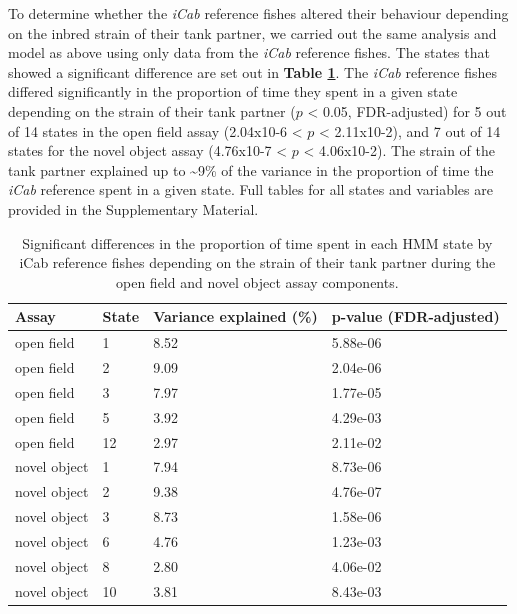 \documentclass[
]{book}
\begin{document}
To determine whether the \emph{iCab} reference fishes altered their behaviour depending on the inbred strain of their tank partner, we carried out the same analysis and model as above using only data from the \emph{iCab} reference fishes. The states that showed a significant difference are set out in \textbf{Table \ref{tab:pilot-sge-tbl}}. The \emph{iCab} reference fishes differed significantly in the proportion of time they spent in a given state depending on the strain of their tank partner (\(p\) \textless{} 0.05, FDR-adjusted) for 5 out of 14 states in the open field assay (2.04x10-6 \textless{} \(p\) \textless{} 2.11x10-2), and 7 out of 14 states for the novel object assay (4.76x10-7 \textless{} \(p\) \textless{} 4.06x10-2). The strain of the tank partner explained up to \textasciitilde9\% of the variance in the proportion of time the \emph{iCab} reference spent in a given state. Full tables for all states and variables are provided in the Supplementary Material.

\begin{table}

\caption{\label{tab:pilot-sge-tbl}Significant differences in the proportion of time spent in each HMM state by iCab reference fishes depending on the strain of their tank partner during the open field and novel object assay components.}
\centering
\begin{tabular}[t]{l|l|l|l}
\hline
Assay & State & Variance explained (\%) & p-value (FDR-adjusted)\\
\hline
open field & 1 & 8.52 & 5.88e-06\\
\hline
open field & 2 & 9.09 & 2.04e-06\\
\hline
open field & 3 & 7.97 & 1.77e-05\\
\hline
open field & 5 & 3.92 & 4.29e-03\\
\hline
open field & 12 & 2.97 & 2.11e-02\\
\hline
novel object & 1 & 7.94 & 8.73e-06\\
\hline
novel object & 2 & 9.38 & 4.76e-07\\
\hline
novel object & 3 & 8.73 & 1.58e-06\\
\hline
novel object & 6 & 4.76 & 1.23e-03\\
\hline
novel object & 8 & 2.80 & 4.06e-02\\
\hline
novel object & 10 & 3.81 & 8.43e-03\\
\hline
\end{tabular}
\end{table}
\end{document}
